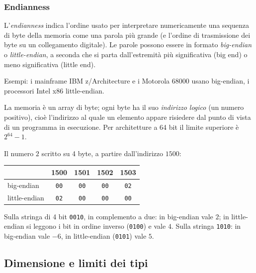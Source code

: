 \documentclass[11pt,a4paper]{article}
\begin{document}
\subsubsection{Endianness}

\begin{definizione}
L'\emph{endianness} indica l'ordine usato per interpretare numericamente una
sequenza di byte della memoria come una parola più grande (e l'ordine di
trasmissione dei byte su un collegamento digitale). Le parole possono essere in
formato \emph{big-endian} o \emph{little-endian}, a seconda che si parta
dall'estremità più significativa (big end) o meno significativa (little end).
\end{definizione}

Esempi: i mainframe IBM z/Architecture e i Motorola 68000 usano big-endian, i
processori Intel x86 little-endian.

La memoria è un array di byte; ogni byte ha il suo \emph{indirizzo logico}
(un numero positivo), cioè l'indirizzo al quale un elemento appare risiedere dal
punto di vista di un programma in esecuzione. Per architetture a 64 bit il limite
superiore è $2^{64} - 1$.

\begin{esempio}
Il numero $2$ scritto su 4 byte, a partire dall'indirizzo $1500$:
\begin{center}
\begin{tabular}{lcccc}
\toprule
 & 1500 & 1501 & 1502 & 1503 \\
\midrule
big-endian    & \texttt{00} & \texttt{00} & \texttt{00} & \texttt{02} \\
little-endian & \texttt{02} & \texttt{00} & \texttt{00} & \texttt{00} \\
\bottomrule
\end{tabular}
\end{center}
\end{esempio}

\begin{esempio}
Sulla stringa di 4 bit \texttt{0010}, in complemento a due: in big-endian vale $2$;
in little-endian si leggono i bit in ordine inverso (\texttt{0100}) e vale $4$.
Sulla stringa \texttt{1010}: in big-endian vale $-6$, in little-endian
(\texttt{0101}) vale $5$.
\end{esempio}

\subsection{Dimensione e limiti dei tipi}
\end{document}
